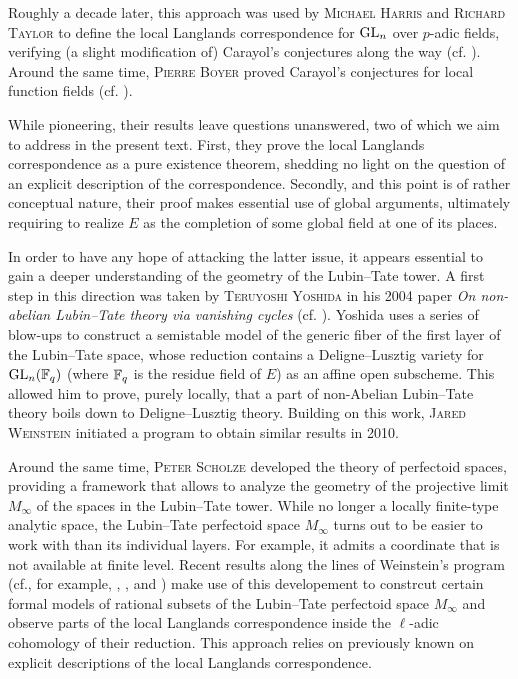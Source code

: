 \documentclass[../main.tex]{subfiles}
\begin{document}
Roughly a decade later, this approach was used by \textsc{Michael Harris} and
\textsc{Richard Taylor} to define the local Langlands correspondence for
$\operatorname{GL}_n$ over $p$-adic fields, verifying (a slight modification of)
Carayol's conjectures along the way (cf. \cite{HTShimura}). 
Around the same time, \textsc{Pierre Boyer} 
proved Carayol's conjectures for local function fields (cf. \cite{boyer1999mauvaise}). 

While pioneering, their results leave questions unanswered, two of which we aim
to address in the present text. First, they prove the local Langlands correspondence
as a pure existence theorem, shedding no light on the question of an explicit description
of the correspondence. Secondly, and this point is of rather conceptual nature, 
their proof makes essential use of global arguments, ultimately requiring to 
realize $E$ as the completion of some global field at one of its places.

In order to have any hope of attacking the latter issue, it appears essential
to gain a deeper understanding of the geometry of the Lubin--Tate tower. 
A first step in this direction was taken by \textsc{Teruyoshi Yoshida} in his
2004 paper \textit{On non-abelian Lubin--Tate theory via vanishing cycles}
(cf. \cite{yoshida2010non}).
Yoshida uses a series of blow-ups to construct a
semistable model of the generic fiber of the first layer of the Lubin--Tate space,
whose reduction contains a Deligne--Lusztig variety for $\operatorname{GL}_n(\mathbb{F}_q)$ (where
$\mathbb{F}_q$ is the residue field of $E$) as an affine open subscheme. This allowed
him to prove, purely locally, that a part of non-Abelian Lubin--Tate theory
boils down to Deligne--Lusztig theory. 
Building on this work, \textsc{Jared Weinstein} initiated a program
to obtain similar results in 2010. 

Around the same time, \textsc{Peter Scholze} developed the theory of perfectoid spaces,
providing a framework that allows to analyze the geometry of the projective limit 
$M_\infty$ of the spaces in the Lubin--Tate tower. 
While no longer a locally finite-type analytic space, the
Lubin--Tate perfectoid space $M_\infty$ turns out to be easier to work with than 
its individual layers. For example, it admits a coordinate that is not
available at finite level.
Recent results along the lines of Weinstein's program
(cf., for example, \cite{weinstein2016semistable},
\cite{BoyarchenkoWeinstein2011MaxVar}, \cite{imaitsushima2020affinoids} and 
\cite{tokimoto2020affinoids}) make use of this developement to constrcut
certain formal models of rational subsets of the Lubin--Tate perfectoid space
$M_{\infty}$ and observe parts of the local Langlands correspondence
inside the $\ell$-adic cohomology of their reduction. This approach relies on
previously known on explicit descriptions of the local Langlands
correspondence.
\end{document}
